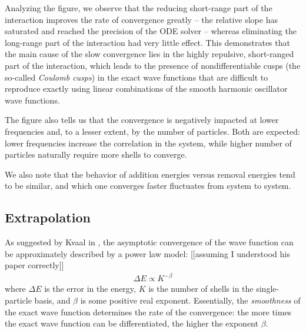 Analyzing the figure, we observe that the reducing short-range part of the interaction improves the rate of convergence greatly -- the relative slope has saturated and reached the precision of the ODE solver -- whereas eliminating the long-range part of the interaction had very little effect.  This demonstrates that the main cause of the slow convergence lies in the highly repulsive, short-ranged part of the interaction, which leads to the presence of nondifferentiable cusps (the so-called \textit{Coulomb cusps}) in the exact wave functions that are difficult to reproduce exactly using linear combinations of the smooth harmonic oscillator wave functions.

The figure also tells us that the convergence is negatively impacted at lower frequencies and, to a lesser extent, by the number of particles.  Both are expected: lower frequencies increase the correlation in the system, while higher number of particles naturally require more shells to converge.

We also note that the behavior of addition energies versus removal energies tend to be similar, and which one converges faster fluctuates from system to system.

\subsection{Extrapolation}

As suggested by Kvaal in \cite{PhysRevB.80.045321}, the asymptotic convergence of the wave function can be approximately described by a power law model: [[assuming I understood his paper correctly]]
\begin{align*}
  \Delta E \propto K^{-\beta}
\end{align*}
where $\Delta E$ is the error in the energy, $K$ is the number of shells in the single-particle basis, and $\beta$ is some positive real exponent.  Essentially, the \textit{smoothness} of the exact wave function determines the rate of the convergence: the more times the exact wave function can be differentiated, the higher the exponent $\beta$.

